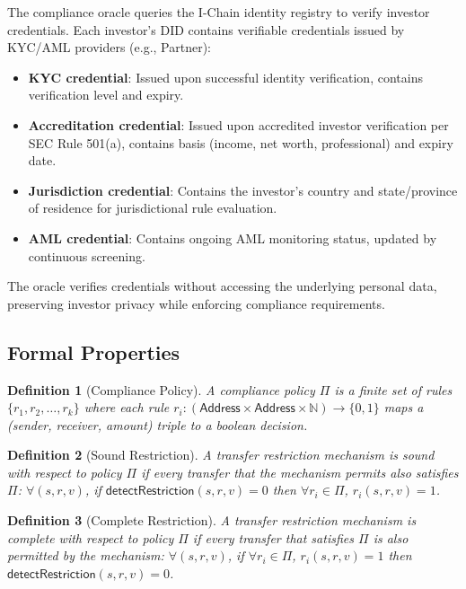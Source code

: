 \documentclass[11pt,a4paper]{article}
\newtheorem{definition}{Definition}
\begin{document}
The compliance oracle queries the I-Chain identity registry to verify investor credentials. Each investor's DID contains verifiable credentials issued by KYC/AML providers (e.g., Partner):

\begin{itemize}[nosep]
  \item \textbf{KYC credential}: Issued upon successful identity verification, contains verification level and expiry.
  \item \textbf{Accreditation credential}: Issued upon accredited investor verification per SEC Rule 501(a), contains basis (income, net worth, professional) and expiry date.
  \item \textbf{Jurisdiction credential}: Contains the investor's country and state/province of residence for jurisdictional rule evaluation.
  \item \textbf{AML credential}: Contains ongoing AML monitoring status, updated by continuous screening.
\end{itemize}

The oracle verifies credentials without accessing the underlying personal data, preserving investor privacy while enforcing compliance requirements.

\subsection{Formal Properties}

\begin{definition}[Compliance Policy]
A compliance policy $\Pi$ is a finite set of rules $\{r_1, r_2, \ldots, r_k\}$ where each rule $r_i : (\textsf{Address} \times \textsf{Address} \times \mathbb{N}) \to \{0, 1\}$ maps a (sender, receiver, amount) triple to a boolean decision.
\end{definition}

\begin{definition}[Sound Restriction]
A transfer restriction mechanism is \emph{sound} with respect to policy $\Pi$ if every transfer that the mechanism permits also satisfies $\Pi$: $\forall (s, r, v)$, if $\textsf{detectRestriction}(s, r, v) = 0$ then $\forall r_i \in \Pi$, $r_i(s, r, v) = 1$.
\end{definition}

\begin{definition}[Complete Restriction]
A transfer restriction mechanism is \emph{complete} with respect to policy $\Pi$ if every transfer that satisfies $\Pi$ is also permitted by the mechanism: $\forall (s, r, v)$, if $\forall r_i \in \Pi$, $r_i(s, r, v) = 1$ then $\textsf{detectRestriction}(s, r, v) = 0$.
\end{definition}
\end{document}
